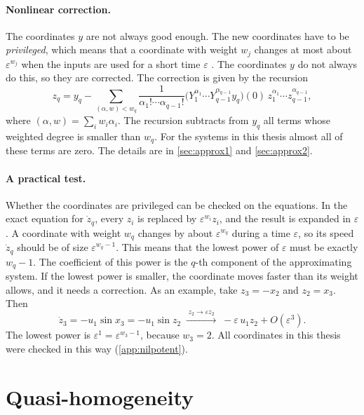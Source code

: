 \paragraph{Nonlinear correction.}
The coordinates $y$ are not always good enough. The new coordinates have to be
\emph{privileged}, which means that a coordinate with weight $w_j$ changes at
most about $\varepsilon^{w_j}$ when the inputs are used for a short time
$\varepsilon$ \cite{bellaiche2005}. The coordinates $y$ do not always do this,
so they are corrected. The correction is given by the recursion
\begin{equation}
  z_q=y_q-\sum_{(\alpha,w)<w_q}\frac{1}{\alpha_1!\cdots\alpha_{q-1}!}
      \bigl(Y_1^{\alpha_1}\cdots Y_{q-1}^{\alpha_{q-1}}y_q\bigr)(0)\,
      z_1^{\alpha_1}\cdots z_{q-1}^{\alpha_{q-1}},
  \label{eq:bellaiche}
\end{equation}
where $(\alpha,w)=\sum_i w_i\alpha_i$. The recursion subtracts from $y_q$ all
terms whose weighted degree is smaller than $w_q$. For the systems in this thesis
almost all of these terms are zero. The details are in \cref{sec:approx1} and
\cref{sec:approx2}.

\paragraph{A practical test.}
Whether the coordinates are privileged can be checked on the equations. In the
exact equation for $\dot z_q$, every $z_i$ is replaced by $\varepsilon^{w_i}z_i$,
and the result is expanded in $\varepsilon$. A coordinate with weight $w_q$
changes by about $\varepsilon^{w_q}$ during a time $\varepsilon$, so its speed
$\dot z_q$ should be of size $\varepsilon^{w_q-1}$. This means that the lowest
power of $\varepsilon$ must be exactly $w_q-1$. The coefficient of this power is
the $q$-th component of the approximating system. If the lowest power is smaller,
the coordinate moves faster than its weight allows, and it needs a correction.
As an example, take $z_3=-x_2$ and $z_2=x_3$. Then
\begin{equation}
  \dot z_3=-u_1\sin x_3=-u_1\sin z_2
  \;\xrightarrow{\;z_2\to\varepsilon z_2\;}\;
  -\varepsilon\,u_1z_2+O(\varepsilon^3).
\end{equation}
The lowest power is $\varepsilon^1=\varepsilon^{w_3-1}$, because $w_3=2$. All
coordinates in this thesis were checked in this way
(\cref{app:nilpotent}).

\section{Quasi-homogeneity}
\label{sec:homogeneity}

